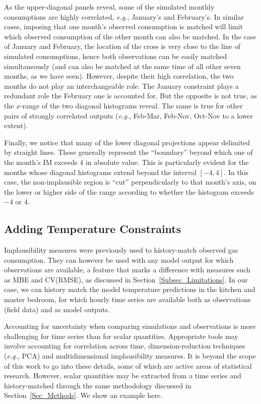 \documentclass[preprint,12pt, sort&compress]{elsarticle}
\begin{document}
As the upper-diagonal panels reveal, some of the simulated monthly consumptions are highly correlated, \textit{e.g.}, January’s and February’s. In similar cases, imposing that one month’s observed consumption is matched will limit which observed consumption of the other month can also be matched. In the case of January and February, the location of the cross is very close to the line of simulated consumptions, hence both observations can be easily matched simultaneously (and can also be matched at the same time of all other seven months, as we have seen). However, despite their high correlation, the two months do not play an interchangeable role. The January constraint plays a redundant role the February one is accounted for. But the opposite is not true, as the $x$-range of the two diagonal histograms reveal. The same is true for other pairs of strongly correlated outputs (\textit{e.g.}, Feb-Mar, Feb-Nov, Oct-Nov to a lower extent).

Finally, we notice that many of the lower diagonal projections appear delimited by straight lines. These generally represent the “boundary” beyond which one of the month’s IM exceeds $4$ in absolute value. This is particularly evident for the months whose diagonal histograms extend beyond the interval $[-4,4]$. In this case, the non-implausible region is “cut” perpendicularly to that month’s axis, on the lower or higher side of the range according to whether the histogram exceeds $-4$ or $4$. 




\subsection{Adding Temperature Constraints}\label{Subsec_Temperature}

Implausibility measures were previously used to history-match observed gas consumption. They can however be used with any model output for which observations are available, a feature that marks a difference with measures such as MBE and CV(RMSE), as discussed in Section~\ref{Subsec_Limitations}. In our case, we can history match the model temperature predictions in the kitchen and master bedroom, for which hourly time series are available both as observations (field data) and as model outputs. 

Accounting for uncertainty when comparing simulations and observations is more challenging for time series than for scalar quantities. Appropriate tools may involve accounting for correlation across time, dimension-reduction techniques (\textit{e.g.}, PCA) and multidimensional implausibility measures. It is beyond the scope of this work to go into these details, some of which are active areas of statistical research. However, scalar quantities may be extracted from a time series and history-matched through the same methodology discussed in Section~\ref{Sec_Methods}. We show an example here.
\end{document}
